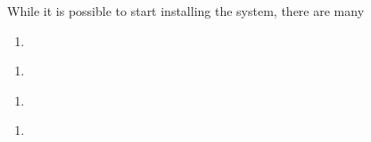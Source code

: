While it is possible to start installing the system, there are many 
\begin{enumerate}
    \item 
\end{enumerate}

\begin{enumerate}[resume*]
    \item 
\end{enumerate}
    
\begin{enumerate}[resume*]
    \item 
\end{enumerate}
    
\begin{enumerate}[resume*]
    \item 
\end{enumerate}